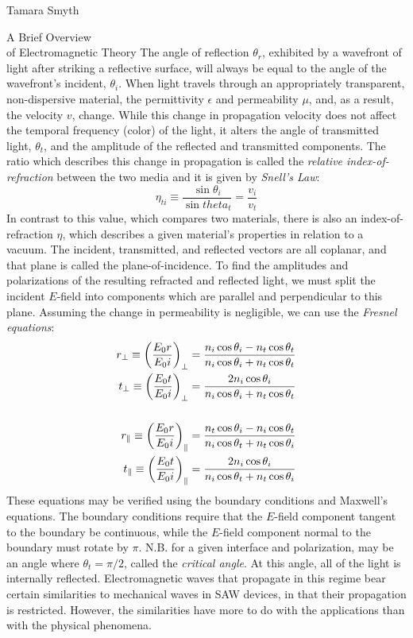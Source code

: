 \documentclass[a4paper,10pt]{report}
\numberwithin{equation}{section}
\begin{document}
\begin{chapter}{Tamara Smyth}
\begin{section}{A Brief Overview \\of Electromagnetic Theory}
The angle of reflection $\theta_r$, exhibited by a wavefront of light after striking a reflective surface, will always be equal to the angle of the wavefront's incident, $\theta_i$. When light travels through an appropriately transparent, non-dispersive material, the permittivity $\epsilon$ and permeability $\mu$, and, as a result, the velocity $v$, change. While this change in propagation velocity does not affect the temporal frequency (color) of the light, it alters the angle of transmitted light, $\theta_t$, and the amplitude of the reflected and transmitted components. The ratio which describes this change in propagation is called the \emph{relative index-of-refraction} between the two media and it is given by \emph{Snell's Law}\cite[p.97]{Hecht1987}:
\begin{equation}\label{snell_em}
\eta_{ti} \equiv \frac{\sin{\theta_i}}{\sin{theta_t}} = \frac{v_i}{v_t}
\end{equation}
In contrast to this value, which compares two materials, there is also an index-of-refraction $\eta$, which describes a given material's properties in relation to a vacuum. The incident, transmitted, and reflected vectors are all coplanar, and that plane is called the plane-of-incidence. To find the amplitudes and polarizations of the resulting refracted and reflected light, we must split the incident $E$-field into components which are parallel and perpendicular to this plane. Assuming the change in permeability is negligible, we can use the \emph{Fresnel equations}: \cite[p.~109]{Hecht1987}
\begin{align}\label{fresnel}
r_\perp \equiv \left( \frac{E_0r}{E_0i} \right)_\perp = \frac{n_i \cos{\theta_i} - n_t \cos{\theta_t}}{n_i \cos{\theta_i} + n_t \cos{\theta_t}}\notag\\
t_\perp \equiv \left( \frac{E_0t}{E_0i} \right)_\perp = \frac{2n_i \cos{\theta_i}}{n_i \cos{\theta_i} + n_t \cos{\theta_t}}\notag\\
{}\notag\\
r_\parallel \equiv \left( \frac{E_0r}{E_0i} \right)_\parallel = \frac{n_t \cos{\theta_i} - n_i \cos{\theta_t}}{n_i \cos{\theta_t} + n_t \cos{\theta_i}}\\
t_\parallel \equiv \left( \frac{E_0t}{E_0i} \right)_\parallel = \frac{2n_i \cos{\theta_i}}{n_i \cos{\theta_t} + n_t \cos{\theta_i}}\notag
\end{align}
These equations may be verified using the boundary conditions and Maxwell's equations. The boundary conditions require that the $E$-field component tangent to the boundary be continuous, while the $E$-field component normal to the boundary must rotate by $\pi$. N.B. for a given interface and polarization, may be an angle where $\theta_t = \pi / 2$, called the \emph{critical angle}. At this angle, all of the light is internally reflected. \cite[p.~112]{Hecht1987} Electromagnetic waves that propagate in this regime bear certain similarities to mechanical waves in SAW devices, in that their propagation is restricted. However, the similarities have more to do with the applications than with the physical phenomena. \cite[p.~440]{Kino1987}


\end{section}
\end{chapter}
\end{document}
